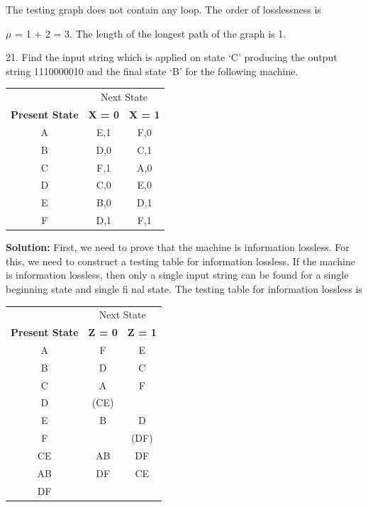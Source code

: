 \documentclass{book}
\begin{document}
 The testing graph does not contain any loop. The order of losslessness is
 
  $\mu$ = 1 + 2 = 3. The length of the longest path of the graph is 1. 
  
   21. Find the input string which is applied on state ‘C’ producing the output string 1110000010 and the ﬁnal state ‘B’ for the following machine.
   
   
   \begin{center}
   	\begin{tabular}{ccc}
   	\hline
   	 &\multicolumn{2}{c}{Next State}\\
   	\cline{2-3}
   	\textbf{Present State} & \textbf{X = 0} & \textbf{X = 1}\\
   	\hline
   	A & E,1 & F,0\\
   	B & D,0 & C,1\\
   	C & F,1 & A,0\\
   	D & C,0 & E,0\\
   	E & B,0 & D,1\\
   	F & D,1 & F,1\\
   	\hline
   	 \end{tabular}
 \end{center}

\textbf{Solution:} First, we need to prove that the machine is information lossless. For this, we need to construct a testing table for information lossless. If the machine is information lossless, then only a single input string can be found for a single beginning state and single ﬁ nal state. The testing table for information lossless is

\begin{center}
	\begin{tabular}{ccc}
		\hline
		& \multicolumn{2}{c}{Next State}\\
		\cline{2-3}
		\textbf{Present State} & \textbf{Z = 0} & \textbf{Z = 1}\\
		\hline
		A & F & E\\
		B & D & C\\
		C & A & F\\
		D & (CE)\\
		E & B & D\\
		F & & (DF)\\
		\hline
		CE & AB & DF\\
		AB & DF & CE\\
		DF\\
		\hline
		
	\end{tabular}
\end{center}
\end{document}
